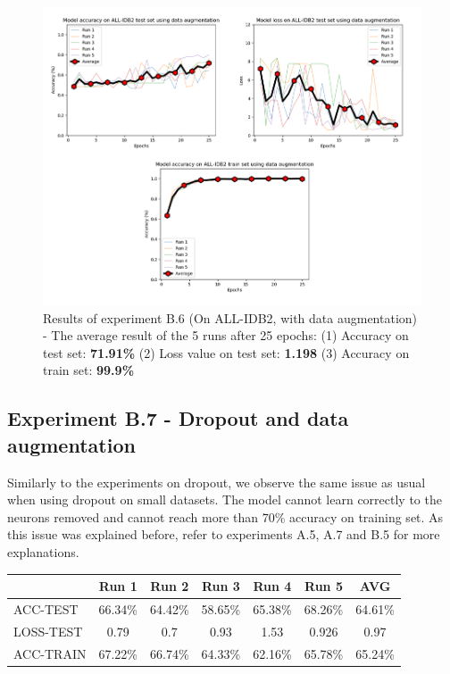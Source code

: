 \documentclass[11pt, openany]{report}
\theoremstyle{plain}
\theoremstyle{definition}
\theoremstyle{remark}
\begin{document}
\begin{figure}[H]
  \centering
  \includegraphics[scale=0.45]{Code/ch6-LeukemiaSubtypes/figures_result/ALL_IDB2/all_idb2-data_aug.PNG}
  \caption{Results of experiment B.6 (On ALL-IDB2, with data augmentation) - The average result of the 5 runs after 25 epochs: (1) Accuracy on test set: \textbf{71.91\%} (2) Loss value on test set: \textbf{1.198} (3) Accuracy on train set: \textbf{99.9\%}}
  \label{fig:results-B6}
\end{figure}


\subsection{Experiment B.7 - Dropout and data augmentation}

Similarly to the experiments on dropout, we observe the same issue as usual when using dropout on small datasets. The model cannot learn correctly to the neurons removed and cannot reach more than 70\% accuracy on training set. As this issue was explained before, refer to experiments A.5, A.7 and B.5 for more explanations. 

\begin{center}
\begin{tabular}{|l|c|c|c|c|c|c|}
  \hline
   & \textbf{Run 1} & \textbf{Run 2} & \textbf{Run 3} & \textbf{Run 4} & \textbf{Run 5} & \textbf{AVG}\\
  \hline
  ACC-TEST & 66.34\% & 64.42\% & 58.65\% & 65.38\% & 68.26\% & 64.61\% \\
  LOSS-TEST & 0.79 & 0.7 & 0.93 & 1.53 & 0.926 & 0.97 \\ 
  ACC-TRAIN & 67.22\% & 66.74\% & 64.33\% & 62.16\% & 65.78\% & 65.24\% \\ 
  \hline
\end{tabular}
\label{table:results-B7}
\end{center}
\end{document}
